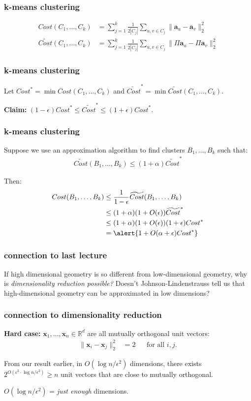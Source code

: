 \documentclass[compress,handout]{beamer}
\newcommand{\bv}[1]{\mathbf{#1}}
\newcommand{\R}{\mathbb{R}}
\begin{document}
\begin{frame}[t]
	\frametitle{k-means clustering}
	\begin{align*}
	Cost(C_1,\ldots, C_k) &= \sum_{j=1}^k \frac{1}{2|C_j|}\sum_{u,v\in C_j} \|\bv{a}_u - \bv{a}_v\|_2^2 \\
	\widetilde{Cost}(C_1,\ldots, C_k) &= \sum_{j=1}^k \frac{1}{2|C_j|}\sum_{u,v\in C_j} \|\Pi\bv{a}_u - \Pi\bv{a}_v\|_2^2
	\end{align*}

\end{frame}

\begin{frame}[t]
	\frametitle{k-means clustering}
	Let $Cost^* = \min Cost(C_1,\ldots, C_k)$ and $\widetilde{Cost}^* = \min \widetilde{Cost}(C_1,\ldots, C_k)$.
	
	\textbf{Claim:} $(1-\epsilon) {Cost}^* \leq \widetilde{Cost}^* \leq (1+\epsilon) {Cost}^*$.
\end{frame}

\begin{frame}[t]
	\frametitle{k-means clustering}
	Suppose we use an approximation algorithm to find clusters $B_1, \ldots, B_k$ such that:
	\begin{align*}
		\widetilde{Cost}(B_1,\ldots, B_k) \leq (1+\alpha)\widetilde{Cost}^*
	\end{align*}

	Then: 
	\begin{align*}
	{Cost}(B_1,\ldots, B_k) &\leq \frac{1}{1-\epsilon}\widetilde{Cost}(B_1,\ldots, B_k) \\
	&\leq (1+\alpha)(1+O(\epsilon))\widetilde{Cost}^*\\
	&\leq (1+\alpha)(1+O(\epsilon))(1+\epsilon){Cost}^*\\
	&= \alert{1 + O(\alpha + \epsilon){Cost}^*}
	\end{align*}
\end{frame}

\begin{frame}
	\frametitle{connection to last lecture}
	If high dimensional geometry is so different from low-dimensional geometry, why is \emph{dimensionality reduction possible?} Doesn't Johnson-Lindenstrauss tell us that high-dimensional geometry can be approximated in low dimensions?
\end{frame}

\begin{frame}
	\frametitle{connection to dimensionality reduction}
	\textbf{Hard case:} $\bv{x}_1, \ldots, \bv{x}_n \in \R^d$ are all mutually orthogonal unit vectors: 
	\begin{align*}
	\|\bv{x}_i - \bv{x}_j\|_2^2 &= 2 & &\text{for all $i,j$.}  
	\end{align*}
	
	From our result earlier, in $O(\log n /\epsilon^2)$ dimensions, there exists $2^{O(\epsilon^2\cdot \log n /\epsilon^2)} \geq n $ unit vectors that are close to mutually orthogonal.
	
	 $O(\log n /\epsilon^2)$ = \emph{just enough} dimensions. 
\end{frame}
\end{document}
